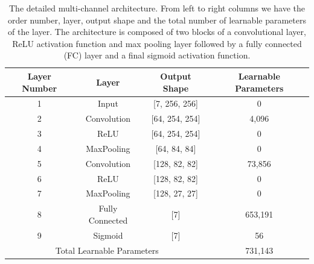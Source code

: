 \documentclass{aa}
\begin{document}
\begin{appendix}
\begin{table}[h!]
\begin{tabular}{|c|c|c|c|}
    \hline
  \end{tabular}
\end{table}

\begin{table}[h!]
  \centering
  \caption{The detailed multi-channel architecture. From left to right columns we have the order number, layer, output shape and the total number of learnable parameters of the layer. The architecture is composed of two blocks of a convolutional layer, ReLU activation function  and max pooling layer followed by a fully connected (FC) layer and a final sigmoid activation function.}  
  \label{tab:multi-channel-arch}
  \begin{tabular}{|c|c|c|c|}
    \hline
     Layer Number & Layer &  Output Shape & Learnable Parameters \\
     \hline
1&           Input    &  [7, 256, 256]    &         0 \\
2&     Convolution    & [64, 254, 254]    &     4,096 \\
3&            ReLU    & [64, 254, 254]    &         0 \\
4&      MaxPooling    &   [64, 84, 84]    &         0 \\
5&     Convolution    &  [128, 82, 82]    &    73,856 \\
6&            ReLU    &  [128, 82, 82]    &         0 \\
7&      MaxPooling    &  [128, 27, 27]    &         0 \\
8& Fully Connected    &            [7]    &   653,191 \\
9&         Sigmoid    &            [7]    &        56 \\
            \hline
\multicolumn{3}{|c|}{Total Learnable Parameters} &   731,143 \\

    \hline
  \end{tabular}
\end{table}

\end{appendix}
\end{document}
